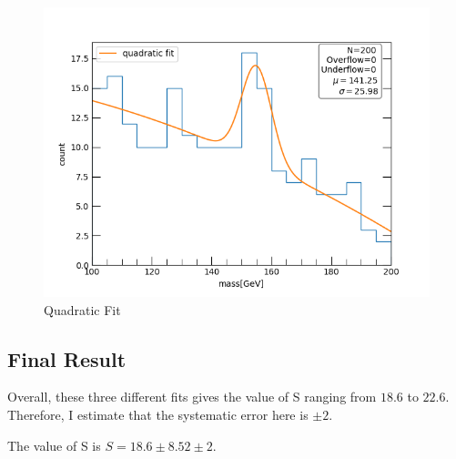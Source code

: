 \documentclass[]{article}
\begin{document}
\begin{figure}[h]
\centering
\includegraphics{./ex1_figs/Fit3_quadratic.png}
\caption{Quadratic Fit}
\end{figure}

\subsection{Final Result}\label{final-result}

Overall, these three different fits gives the value of S ranging from
\(18.6\) to \(22.6\). Therefore, I estimate that the systematic error
here is \(\pm 2\).

The value of S is \(S = 18.6 \pm 8.52 \pm 2\).
\end{document}
